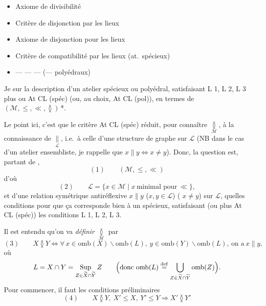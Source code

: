 \documentclass[11pt,a4paper]{article}
\begin{document}
\begin{itemize}
  \item[At L 1] Axiome de divisibilité
  \item[At L 2] Critère de disjonction par les lieux
  \item[At L 3] Axiome de disjonction pour les lieux
  \item[At CL (spéc)] Critère de compatibilité par les lieux (at.\ spécieux)
  \item[At CL (pol)] --- --- --- (--- polyédraux)
\end{itemize}

Je  sur la description d'un atelier spécieux ou polyédral, satisfaisant L 1, L 2, L 3 plus  ou At CL (spéc) (ou, au choix, At CL (pol)), en termes de $(\mathcal{M}, \leq, \ll, \between)$\,*.


Le point ici, c'est que le critère At CL (spéc) \ill{} réduit, pour connaître $\underset{\mathcal{M}}{\between}$, à la connaissance de $\underset{\mathcal{L}}{\parallel}$, i.e.\ à celle d'une structure de graphe sur $\mathcal{L}$ (NB dans le cas d'un atelier ensembliste, je rappelle que $x \parallel y \Leftrightarrow x \neq y$). Donc, la question est, partant de , 
\[
  (1) \qquad (\mathcal{M}, \leq, \ll)
\]
d'où
\[
  (2) \qquad \mathcal{L} = \lbrace x \in \mathcal{M} \mid x \ \text{minimal pour}\ \ll \rbrace ,
\]
et d'une relation symétrique antiréflexive $x \parallel y$ ($x, y \in \mathcal{L}$) (\ill{} $x \neq y$) sur $\mathcal{L}$, quelles conditions \ill{} pour que ça corresponde bien à un \ill{} spécieux, satisfaisant  (ou plus At CL (spéc)) les conditions L 1, L 2, L 3.

\marginal{\ill{}}

Il est entendu qu'on va \emph{définir} $\underset{\mathcal{M}}{\between}$ par
\[
  (3) \qquad X \between Y \iff \forall\, x \in \mathrm{omb}(X) \smallsetminus \mathrm{omb}(L),\ y \in \mathrm{omb}(Y) \smallsetminus \mathrm{omb}(L), \ \text{on a}\ x \parallel y ,
\]
où
\[
  L = X \cap Y = \operatorname*{Sup}_{Z \in \widetilde{X} \cap \widetilde{Y}} Z \qquad \Bigl(\text{donc}\ \mathrm{omb}(L) \overset{\mathrm{def}}{=} \bigcup_{Z \in \widetilde{X} \cap \widetilde{Y}} \mathrm{omb}(Z)\Bigr) .
\]
Pour commencer, il faut   les conditions préliminaires
\[
  (4) \qquad X \between Y,\ X' \leq X,\ Y' \leq Y \Longrightarrow X' \between Y'
\]
\end{document}
